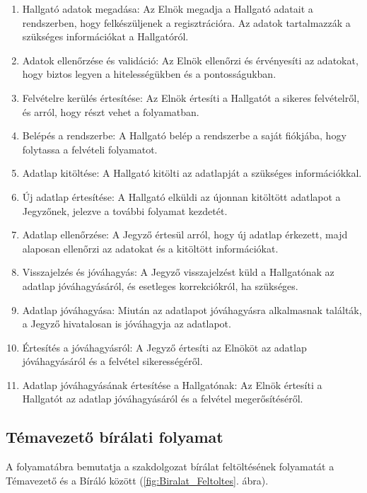 \documentclass[a4paper,12pt]{article}
\begin{document}
\begin{enumerate}
\item Hallgató adatok megadása: Az Elnök megadja a Hallgató adatait a rendszerben, hogy felkészüljenek a regisztrációra. Az adatok tartalmazzák a szükséges információkat a Hallgatóról.
\item Adatok ellenőrzése és validáció: Az Elnök ellenőrzi és érvényesíti az adatokat, hogy biztos legyen a hitelességükben és a pontosságukban.
\item Felvételre kerülés értesítése: Az Elnök értesíti a Hallgatót a sikeres felvételről, és arról, hogy részt vehet a folyamatban.
\item Belépés a rendszerbe: A Hallgató belép a rendszerbe a saját fiókjába, hogy folytassa a felvételi folyamatot.
\item Adatlap kitöltése: A Hallgató kitölti az adatlapját a szükséges információkkal.
\item Új adatlap értesítése: A Hallgató elküldi az újonnan kitöltött adatlapot a Jegyzőnek, jelezve a további folyamat kezdetét.
\item Adatlap ellenőrzése: A Jegyző értesül arról, hogy új adatlap érkezett, majd alaposan ellenőrzi az adatokat és a kitöltött információkat.
\item Visszajelzés és jóváhagyás: A Jegyző visszajelzést küld a Hallgatónak az adatlap jóváhagyásáról, és esetleges korrekciókról, ha szükséges.
\item Adatlap jóváhagyása: Miután az adatlapot jóváhagyásra alkalmasnak találták, a Jegyző hivatalosan is jóváhagyja az adatlapot.
\item Értesítés a jóváhagyásról: A Jegyző értesíti az Elnököt az adatlap jóváhagyásáról és a felvétel sikerességéről.
\item Adatlap jóváhagyásának értesítése a Hallgatónak: Az Elnök értesíti a Hallgatót az adatlap jóváhagyásáról és a felvétel megerősítéséről.
\end{enumerate}

\subsection{Témavezető bírálati folyamat}

A folyamatábra bemutatja a szakdolgozat bírálat feltöltésének folyamatát a Témavezető és a Bíráló között (\ref{fig:Biralat_Feltoltes}. ábra).
\end{document}

